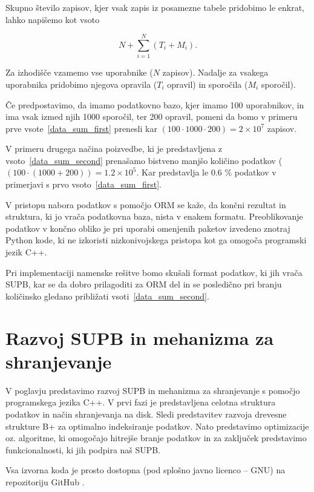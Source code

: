 \documentclass[a4paper,12pt,openright]{book}
\begin{document}
    \noindent
    Skupno število zapisov, kjer vsak zapis iz posamezne tabele pridobimo le enkrat, lahko napišemo kot vsoto

    \begin{equation}
        N + \sum_{i=1}^{N} (T_i + M_i).
    \label{data_sum_second}
    \end{equation}

    \noindent
    Za izhodišče vzamemo vse uporabnike ($N$ zapisov). Nadalje za vsakega uporabnika pridobimo njegova opravila ($T_i$ opravil) in sporočila ($M_i$ sporočil).
    
    Če predpostavimo, da imamo podatkovno bazo, kjer imamo \num{100} uporabnikov, in ima vsak izmed njih \num{1000} sporočil, ter \num{200} opravil, pomeni da bomo v primeru prve vsote~\eqref{data_sum_first} prenesli kar $(100 \cdot 1000 \cdot 200) = 2 \times 10^7$ zapisov.

    V primeru drugega načina poizvedbe, ki je predstavljena z vsoto~\eqref{data_sum_second} prenašamo bistveno manjšo količino podatkov ($(100 \cdot (1000 + 200)) = 1.2 \times 10^5$. Kar predstavlja le $0.6$ \% podatkov v primerjavi s prvo vsoto~\eqref{data_sum_first}.

    V pristopu nabora podatkov s pomočjo ORM se kaže, da končni rezultat in struktura, ki jo vrača podatkovna baza, nista v enakem formatu. Preoblikovanje podatkov v končno obliko je pri uporabi omenjenih paketov izvedeno znotraj Python kode, ki ne izkoristi nizkonivojskega pristopa kot ga omogoča programski jezik C++.

    Pri implementaciji namenske rešitve bomo skušali format podatkov, ki jih vrača SUPB, kar se da dobro prilagoditi za ORM del in se posledično pri branju količinsko gledano približati vsoti~\eqref{data_sum_second}.

\chapter{Razvoj SUPB in mehanizma za shranjevanje}
\label{ch0}
    V poglavju predstavimo razvoj SUPB in mehanizma za shranjevanje s pomočjo programskega jezika C++. V prvi fazi je predstavljena celotna struktura podatkov in način shranjevanja na disk. Sledi predstavitev razvoja drevesne strukture B+ za optimalno indeksiranje podatkov. Nato predstavimo optimizacije oz. algoritme, ki omogočajo hitrejše branje podatkov in za zaključek predstavimo funkcionalnosti, ki jih podpira naš SUPB.

    Vsa izvorna koda je prosto dostopna (pod splošno javno licenco – GNU) na repozitoriju GitHub \cite{GRAPHENIX_GITHUB}.
\end{document}
